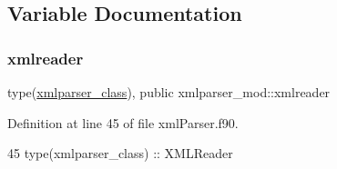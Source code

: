 \subsection{Variable Documentation}
\mbox{\label{namespacexmlparser__mod_a482bd93d0a4ba8c9c2000713a4b14799}} 
\subsubsection{\texorpdfstring{xmlreader}{xmlreader}}
{\footnotesize\ttfamily type(\mbox{\hyperlink{structxmlparser__mod_1_1xmlparser__class}{xmlparser\+\_\+class}}), public xmlparser\+\_\+mod\+::xmlreader}



Definition at line 45 of file xml\+Parser.\+f90.


\begin{DoxyCode}
45     \textcolor{keywordtype}{type}(xmlparser\_class) :: XMLReader
\end{DoxyCode}
